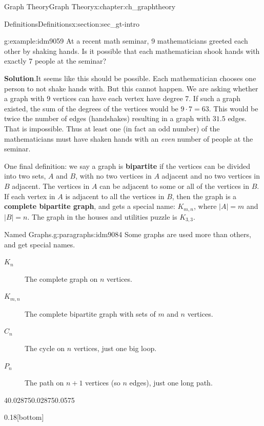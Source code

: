 \documentclass[oneside,10pt,]{book}
\newcommand{\terminology}[1]{\textbf{#1}}
\numberwithin{equation}{chapter}
\begin{document}
\begin{chapterptx}{Graph Theory}{}{Graph Theory}{}{}{x:chapter:ch_graphtheory}
\begin{sectionptx}{Definitions}{}{Definitions}{}{}{x:section:sec_gt-intro}
\begin{example}{}{g:example:idm9059}%
At a recent math seminar, 9 mathematicians greeted each other by shaking hands. Is it possible that each mathematician shook hands with exactly 7 people at the seminar?%
\par\smallskip%
\noindent\textbf{Solution}.\hypertarget{g:solution:idm9062}{}\quad{}It seems like this should be possible. Each mathematician chooses one person to not shake hands with. But this cannot happen. We are asking whether a graph with 9 vertices can have each vertex have degree 7. If such a graph existed, the sum of the degrees of the vertices would be \(9\cdot 7 = 63\). This would be twice the number of edges (handshakes) resulting in a graph with \(31.5\) edges. That is impossible. Thus at least one (in fact an odd number) of the mathematicians must have shaken hands with an \emph{even} number of people at the seminar.%
\end{example}
One final definition: we say a graph is \terminology{bipartite} if the vertices can be divided into two sets, \(A\) and \(B\), with no two vertices in \(A\) adjacent and no two vertices in \(B\) adjacent. The vertices in \(A\) can be adjacent to some or all of the vertices in \(B\). If each vertex in \(A\) is adjacent to all the vertices in \(B\), then the graph is a \terminology{complete bipartite graph}, and gets a special name: \(K_{m,n}\), where \(|A| = m\) and \(|B| = n\). The graph in the houses and utilities puzzle is \(K_{3,3}\).%
\begin{paragraphs}{Named Graphs.}{g:paragraphs:idm9084}%
Some graphs are used more than others, and get special names.%
\begin{description}
\item[{\(K_n\)}]The complete graph on \(n\) vertices.\label{g:notation:idm9093}%
\item[{\(K_{m,n}\)}]The complete bipartite graph with sets of \(m\) and \(n\) vertices. \label{g:notation:idm9103}%
\item[{\(C_n\)}]The cycle on \(n\) vertices, just one big loop. \label{g:notation:idm9113}%
\item[{\(P_n\)}]The path on \(n+1\) vertices (so \(n\) edges), just one long path. \label{g:notation:idm9123}%
\end{description}
%
\begin{sidebyside}{4}{0.02875}{0.02875}{0.0575}%
\begin{sbspanel}{0.18}[bottom]%
\resizebox{\linewidth}{!}{%
				\begin{tikzpicture}[scale=1]

\end{tikzpicture}}
\end{sbspanel}
\end{sidebyside}
\end{paragraphs}
\end{sectionptx}
\end{chapterptx}
\end{document}
